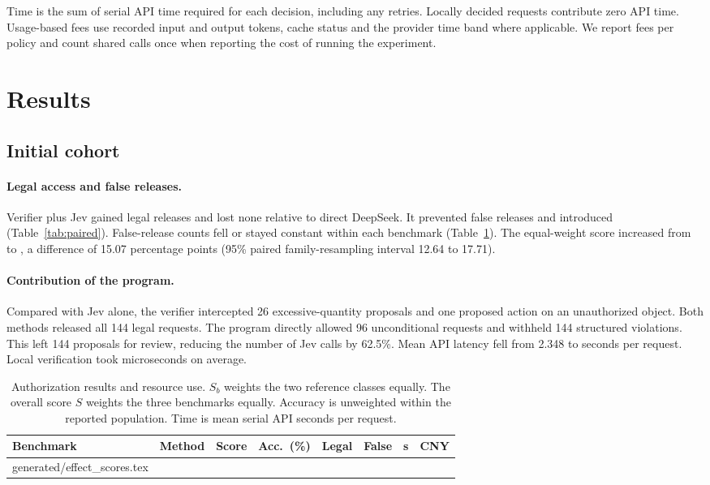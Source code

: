 \documentclass[10pt,letterpaper]{article}
\makeatletter
\newcommand{\tablerows}[1]{\@@input #1 }
\makeatother
\begin{document}
Time is the sum of serial API time required for each decision, including any retries. Locally decided requests contribute zero API time. Usage-based fees use recorded input and output tokens, cache status and the provider time band where applicable. We report fees per policy and count shared calls once when reporting the cost of running the experiment.

\section{Results}
\subsection{Initial cohort}

\paragraph{Legal access and false releases.}
Verifier plus Jev gained \EffectLegalGain{} legal releases and lost none relative to direct DeepSeek. It prevented \EffectPreventedFalse{} false releases and introduced \EffectNewFalse{} (Table~\ref{tab:paired}). False-release counts fell or stayed constant within each benchmark (Table~\ref{tab:rates}). The equal-weight score increased from \EffectDirectScore{} to \EffectJointScore{}, a difference of 15.07 percentage points (95\% paired family-resampling interval 12.64 to 17.71).

\paragraph{Contribution of the program.}
Compared with Jev alone, the verifier intercepted 26 excessive-quantity proposals and one proposed action on an unauthorized object. Both methods released all 144 legal requests. The program directly allowed 96 unconditional requests and withheld 144 structured violations. This left 144 proposals for review, reducing the number of Jev calls by 62.5\%. Mean API latency fell from 2.348 to \EffectJointTime{} seconds per request. Local verification took \EffectLocalTime{} microseconds on average.

\begin{table}[!htb]\centering\small
\setlength{\tabcolsep}{5pt}
\caption{Authorization results and resource use. \(S_b\) weights the two reference classes equally. The overall score \(S\) weights the three benchmarks equally. Accuracy is unweighted within the reported population. Time is mean serial API seconds per request.}
\label{tab:rates}
\begin{tabular}{@{}llrrrrrr@{}}\toprule
Benchmark & Method & Score & Acc.\ (\%) & Legal & False & s & CNY \\ \midrule
\tablerows{generated/effect_scores.tex}
\bottomrule\end{tabular}
\end{table}
\end{document}
